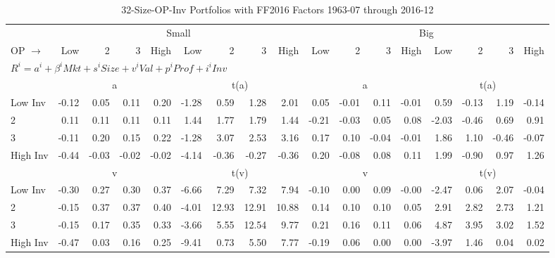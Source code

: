 
\begin{table}[!ht]
\centering
\caption{32-Size-OP-Inv Portfolios with FF2016 Factors 1963-07 through 2016-12}
\begin{tabular}{lrrrrrrrrrrrrrrrr}
  \toprule
    & \multicolumn{8}{c}{Small} & \multicolumn{8}{c}{Big} \\
      \cmidrule(r){2-9} \cmidrule(r){10-17}
    OP $\rightarrow$ & Low & 2 & 3 & High & Low & 2 & 3 & High & Low & 2 & 3 & High & Low & 2 & 3 & High \\ 
  \midrule
  \multicolumn{17}{l}{$R^i=a^i+\beta^iMkt+s^iSize+v^iVal+p^iProf+i^iInv$} \\

  
    
      & \multicolumn{4}{c}{a} & \multicolumn{4}{c}{t(a)}
    
      & \multicolumn{4}{c}{a} & \multicolumn{4}{c}{t(a)}
    
    \\
      \cmidrule(r){2-5} \cmidrule(r){6-9} \cmidrule(r){10-13} \cmidrule(r){14-17}

    Low Inv   & -0.12  & 0.05  & 0.11  & 0.20  & -1.28  & 0.59  & 1.28  & 2.01  & 0.05  & -0.01  & 0.11  & -0.01  & 0.59  & -0.13  & 1.19  & -0.14  \\
           2  & 0.11  & 0.11  & 0.11  & 0.11  & 1.44  & 1.77  & 1.79  & 1.44  & -0.21  & -0.03  & 0.05  & 0.08  & -2.03  & -0.46  & 0.69  & 0.91  \\
           3  & -0.11  & 0.20  & 0.15  & 0.22  & -1.28  & 3.07  & 2.53  & 3.16  & 0.17  & 0.10  & -0.04  & -0.01  & 1.86  & 1.10  & -0.46  & -0.07  \\
    High Inv  & -0.44  & -0.03  & -0.02  & -0.02  & -4.14  & -0.36  & -0.27  & -0.36  & 0.20  & -0.08  & 0.08  & 0.11  & 1.99  & -0.90  & 0.97  & 1.26  \\

  
    
      & \multicolumn{4}{c}{v} & \multicolumn{4}{c}{t(v)}
    
      & \multicolumn{4}{c}{v} & \multicolumn{4}{c}{t(v)}
    
    \\
      \cmidrule(r){2-5} \cmidrule(r){6-9} \cmidrule(r){10-13} \cmidrule(r){14-17}

    Low Inv   & -0.30  & 0.27  & 0.30  & 0.37  & -6.66  & 7.29  & 7.32  & 7.94  & -0.10  & 0.00  & 0.09  & -0.00  & -2.47  & 0.06  & 2.07  & -0.04  \\
           2  & -0.15  & 0.37  & 0.37  & 0.40  & -4.01  & 12.93  & 12.91  & 10.88  & 0.14  & 0.10  & 0.10  & 0.05  & 2.91  & 2.82  & 2.73  & 1.21  \\
           3  & -0.15  & 0.17  & 0.35  & 0.33  & -3.66  & 5.55  & 12.54  & 9.77  & 0.21  & 0.16  & 0.11  & 0.06  & 4.87  & 3.95  & 3.02  & 1.52  \\
    High Inv  & -0.47  & 0.03  & 0.16  & 0.25  & -9.41  & 0.73  & 5.50  & 7.77  & -0.19  & 0.06  & 0.00  & 0.00  & -3.97  & 1.46  & 0.04  & 0.02  \\


\end{tabular}
\end{table}
